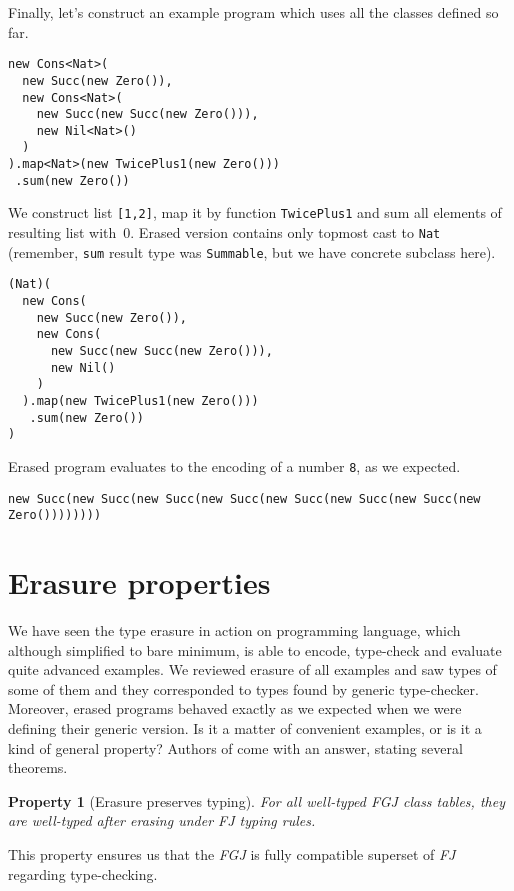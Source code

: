 \documentclass{article}[12pt]
\begin{document}
Finally, let's construct an example program which uses all the classes
defined so far.

\begin{verbatim}
new Cons<Nat>(
  new Succ(new Zero()),
  new Cons<Nat>(
    new Succ(new Succ(new Zero())),
    new Nil<Nat>()
  )
).map<Nat>(new TwicePlus1(new Zero()))
 .sum(new Zero())
\end{verbatim}

We construct list \texttt{[1,2]}, map it by function
\texttt{TwicePlus1} and sum all elements of resulting list
with~0. Erased version contains only topmost cast to \texttt{Nat}
(remember, \texttt{sum} result type was \texttt{Summable},
but we have concrete subclass here).

\begin{verbatim}
(Nat)(
  new Cons(
    new Succ(new Zero()),
    new Cons(
      new Succ(new Succ(new Zero())),
      new Nil()
    )
  ).map(new TwicePlus1(new Zero()))
   .sum(new Zero())
)
\end{verbatim}

Erased program evaluates to the encoding of a number \texttt{8},
as we expected.

\begin{verbatim}
new Succ(new Succ(new Succ(new Succ(new Succ(new Succ(new Succ(new Zero())))))))
\end{verbatim}


\section{Erasure properties}

We have seen the type erasure in action on programming language,
which although simplified to bare minimum, is able to encode,
type-check and evaluate quite advanced examples. We reviewed
erasure of all examples and saw types of some of them and
they corresponded to types found by generic type-checker. Moreover,
erased programs behaved exactly as we expected when we were
defining their generic version. Is it a matter of convenient
examples, or is it a kind of general property?
Authors of \cite{fj} come with an answer, stating several theorems.

\newtheorem{theorem}{Property}
\begin{theorem}[Erasure preserves typing]
For all well-typed \emph{FGJ} class tables, they are well-typed
after erasing under \emph{FJ} typing rules.
\end{theorem}
This property ensures us that the \emph{FGJ} is fully compatible
superset of \emph{FJ} regarding type-checking.
\end{document}
